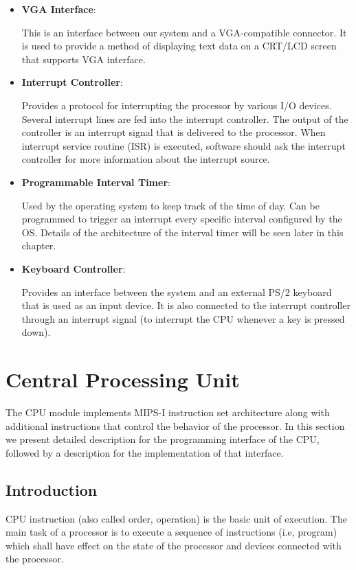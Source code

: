 \documentclass[oneside]{book}
\begin{document}
\begin{itemize}
\item \textbf{VGA Interface}:

This is an interface between our system and a VGA-compatible connector.
It is used to provide a method of displaying text data on a CRT/LCD screen
that supports VGA interface.

\item \textbf{Interrupt Controller}:

Provides a protocol for interrupting the processor by various I/O devices.
Several interrupt lines are fed into the interrupt controller. The output
of the controller is an interrupt signal that is delivered to the processor.
When interrupt service routine (ISR) is executed, software should ask
the interrupt controller for more information about the interrupt source.

\item \textbf{Programmable Interval Timer}:

Used by the operating system to keep track of the time of day. Can be
programmed to trigger an interrupt every specific interval configured
by the OS. Details of the architecture of the interval timer will be
seen later in this chapter.

\item \textbf{Keyboard Controller}:

Provides an interface between the system and an external PS/2 keyboard
that is used as an input device. It is also connected to the interrupt
controller through an interrupt signal (to interrupt the CPU whenever
a key is pressed down).

\end{itemize}

\section{Central Processing Unit}

The CPU module implements MIPS-I instruction set architecture along with
additional instructions that control the behavior of the processor. In this
section we present detailed description for the programming interface
of the CPU, followed by a description for the implementation of that
interface.

\subsection{Introduction}

CPU instruction (also called order, operation) is the basic unit
of execution. The main task of a processor is to execute a sequence
of instructions (i.e, program) which shall have effect on the state
of the processor and devices connected with the processor.\\
\end{document}
